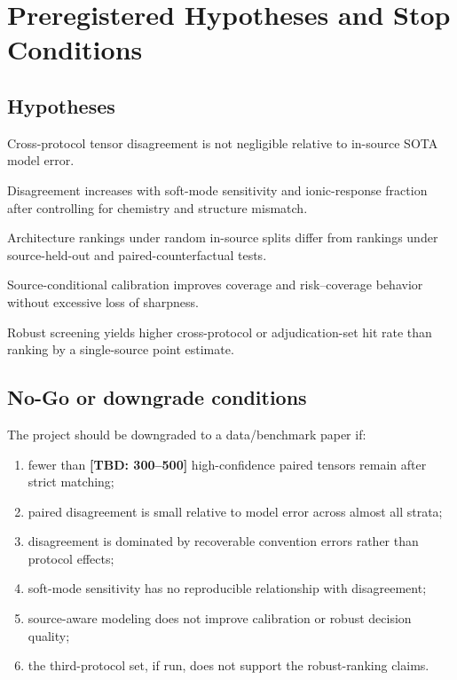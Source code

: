 \documentclass[11pt]{article}
\newcommand{\TBD}[1]{\textcolor{red!75!black}{\textbf{[TBD: #1]}}}
\begin{document}
\section{Preregistered Hypotheses and Stop Conditions}

\subsection{Hypotheses}

\begin{description}[leftmargin=2.5em,style=nextline]
    \item[H1: Uncertainty floor] Cross-protocol tensor disagreement is not negligible relative to in-source SOTA model error.
    \item[H2: Mechanistic amplification] Disagreement increases with soft-mode sensitivity and ionic-response fraction after controlling for chemistry and structure mismatch.
    \item[H3: Leaderboard fragility] Architecture rankings under random in-source splits differ from rankings under source-held-out and paired-counterfactual tests.
    \item[H4: Calibration value] Source-conditional calibration improves coverage and risk--coverage behavior without excessive loss of sharpness.
    \item[H5: Decision value] Robust screening yields higher cross-protocol or adjudication-set hit rate than ranking by a single-source point estimate.
\end{description}

\subsection{No-Go or downgrade conditions}

The project should be downgraded to a data/benchmark paper if:
\begin{enumerate}[leftmargin=1.5em]
    \item fewer than \TBD{300--500} high-confidence paired tensors remain after strict matching;
    \item paired disagreement is small relative to model error across almost all strata;
    \item disagreement is dominated by recoverable convention errors rather than protocol effects;
    \item soft-mode sensitivity has no reproducible relationship with disagreement;
    \item source-aware modeling does not improve calibration or robust decision quality;
    \item the third-protocol set, if run, does not support the robust-ranking claims.
\end{enumerate}
\end{document}
